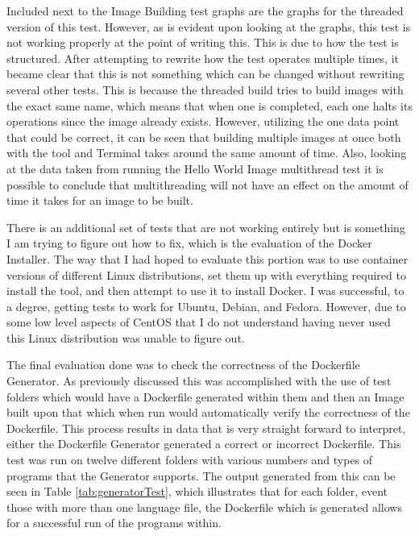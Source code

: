 Included next to the Image Building test graphs are the graphs for the threaded version of this test. However, as is evident upon looking at the graphs, this test is not working properly at the point of writing this. This is due to how the test is structured. After attempting to rewrite how the test operates multiple times, it became clear that this is not something which can be changed without rewriting several other tests. This is because the threaded build tries to build images with the exact same name, which means that when one is completed, each one halts its operations since the image already exists. However, utilizing the one data point that could be correct, it can be seen that building multiple images at once both with the tool and Terminal takes around the same amount of time. Also, looking at the data taken from running the Hello World Image multithread test it is possible to conclude that multithreading will not have an effect on the amount of time it takes for an image to be built.

There is an additional set of tests that are not working entirely but is something I am trying to figure out how to fix, which is the evaluation of the Docker Installer. The way that I had hoped to evaluate this portion was to use container versions of different Linux distributions, set them up with everything required to install the tool, and then attempt to use it to install Docker. I was successful, to a degree, getting tests to work for Ubuntu, Debian, and Fedora. However, due to some low level aspects of CentOS that I do not understand having never used this Linux distribution was unable to figure out.

The final evaluation done was to check the correctness of the Dockerfile Generator. As previously discussed this was accomplished with the use of test folders which would have a Dockerfile generated within them and then an Image built upon that which when run would automatically verify the correctness of the Dockerfile. This process results in data that is very straight forward to interpret, either the Dockerfile Generator generated a correct or incorrect Dockerfile. This test was run on twelve different folders with various numbers and types of programs that the Generator supports. The output generated from this can be seen in Table \ref{tab:generatorTest}, which illustrates that for each folder, event those with more than one language file, the Dockerfile which is generated allows for a successful run of the programs within.



